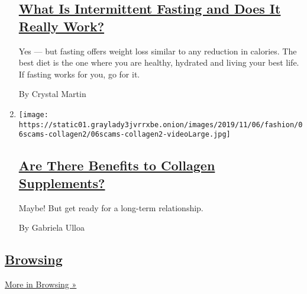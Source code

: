 \begin{enumerate}
  \hypertarget{what-is-intermittent-fasting-and-does-it-really-work}{%
  \subsection{\texorpdfstring{\href{/2019/11/23/style/self-care/intermittent-fasting-benefits.html}{What
  Is Intermittent Fasting and Does It Really
  Work?}}{What Is Intermittent Fasting and Does It Really Work?}}\label{what-is-intermittent-fasting-and-does-it-really-work}}

  Yes --- but fasting offers weight loss similar to any reduction in
  calories. The best diet is the one where you are healthy, hydrated and
  living your best life. If fasting works for you, go for it.

  By Crystal Martin
\item
  \texttt{[image: https://static01.graylady3jvrrxbe.onion/images/2019/11/06/fashion/06scams-collagen2/06scams-collagen2-videoLarge.jpg]}

  \hypertarget{are-there-benefits-to-collagen-supplements}{%
  \subsection{\texorpdfstring{\href{/2019/11/09/style/self-care/collagen-benefits.html}{Are
  There Benefits to Collagen
  Supplements?}}{Are There Benefits to Collagen Supplements?}}\label{are-there-benefits-to-collagen-supplements}}

  Maybe! But get ready for a long-term relationship.

  By Gabriela Ulloa
\end{enumerate}

\hypertarget{browsing}{%
\subsection{\texorpdfstring{\href{/column/browsing}{Browsing}}{Browsing}}\label{browsing}}

\href{/column/browsing}{More in Browsing »}

